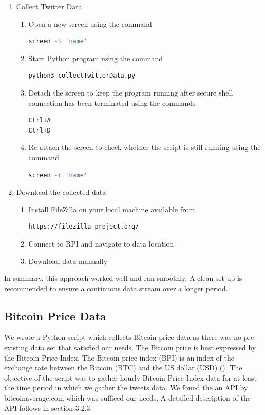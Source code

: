 \documentclass[a4paper,12pt]{article}
\begin{document}
\begin{spacing}{1.2}
\begin{enumerate}
\item Collect Twitter Data
\begin{enumerate}
\item Open a new screen using the command
\begin{lstlisting}[language=bash] 
screen -S 'name' 
\end{lstlisting}
\item Start Python program using the command
\begin{lstlisting}[language=bash]
python3 collectTwitterData.py
\end{lstlisting}
\item Detach the screen to keep the program running after secure shell connection has been terminated using the commands
\begin{lstlisting}[language=bash]
Ctrl+A
Ctrl+D
\end{lstlisting}
\item Re-attach the screen to check whether the script is still running using the command
\begin{lstlisting}[language=bash]
screen -r 'name'
\end{lstlisting}
\end{enumerate}

\item Download the collected data
\begin{enumerate}
\item Install FileZilla on your local machine available from
\begin{lstlisting}[language=bash] 
https://filezilla-project.org/
\end{lstlisting}
\item Connect to RPI and navigate to data location \newline
\item Download data manually \newline \newline \end{enumerate}
\end{enumerate}

In summary, this approach worked well and ran smoothly. A clean set-up is recommended to ensure a continuous data stream over a longer period.


\subsection{Bitcoin Price Data}
We wrote a Python script which collects Bitcoin price data as there was no pre-existing data set that satisfied our needs. The Bitcoin price is best expressed by the Bitcoin Price Index. The Bitcoin price index (BPI) is an index of the exchange rate between the Bitcoin (BTC) and the US dollar (USD) (\cite{kristoufek2015main}). The objective of the script was to gather hourly Bitcoin Price Index data for at least the time period in which we gather the tweets data. We found the an API by bitcoinaverage.com which was sufficed our needs. A detailed description of the API follows in section 3.2.3.


\end{spacing}
\end{document}
